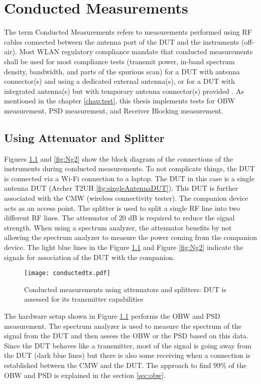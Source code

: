 \chapter{Conducted Measurements} \label{chap:5}

The term Conducted Measurements refers to measurements performed using \acs{RF} cables connected between the antenna port of the \acs{DUT} and the instruments (off-air). Most \acs{WLAN} regulatory compliance mandate that conducted measurements shall be used for most compliance tests (transmit power, in-band spectrum density, bandwidth, and parts of the spurious scan) for a \acs{DUT} with antenna connector(s) and using a dedicated external antenna(s), or for a \acs{DUT} with integrated antenna(s) but with temporary antenna connector(s) provided \cite{conducted}. As mentioned in the chapter \ref{chap:test}, this thesis implements tests for \acf{OBW} measurement, \acf{PSD} measurement, and Receiver Blocking measurement.

\section{Using Attenuator and Splitter}
\label{sec:att}
Figures \ref{fig:Ng1} and \ref{fig:Ng2} show the block diagram of the connections of the instruments during conducted measurements. To not complicate things, the \acs{DUT} is connected via a Wi-Fi\texttrademark{} connection to a laptop. The \acs{DUT} in this case is a single antenna \acs{DUT} (Archer T2UH \ref{fig:singleAntennaDUT}). This \acs{DUT} is further associated with the \ac{CMW} (wireless connectivity tester). The companion device acts as an access point. The splitter is used to split a single \acs{RF} line into two different \acs{RF} lines. The attenuator of 20 dB is required to reduce the signal strength. When using a spectrum analyzer, the attenuator benefits by not allowing the spectrum analyzer to measure the power coming from the companion device. The light blue lines in the Figure \ref{fig:Ng1} and Figure \ref{fig:Ng2} indicate the signals for association of the \acs{DUT} with the companion.
\begin{figure}[H]
\centering
\texttt{[image: conductedtx.pdf]}
\vspace{-3.2cm}  \caption{Conducted measurements using attenuators and splitters: \acs{DUT} is assessed for its transmitter capabilities}
 \label{fig:Ng1} 
\end{figure}

The hardware setup shown in Figure \ref{fig:Ng1} performs the \acf{OBW} and \acf{PSD} measurement. The spectrum analyzer is used to measure the spectrum of the signal from the \acs{DUT} and then assess the \acf{OBW} or the \acf{PSD} based on this data. Since the \acs{DUT} behaves like a transmitter, most of the signal is going away from the \acs{DUT} (dark blue lines) but there is also some receiving when a connection is established between the \acf{CMW} and the \acs{DUT}. The approach to find 99\% of the \acf{OBW} and \acf{PSD} is explained in the section \ref{sec:obw}.

